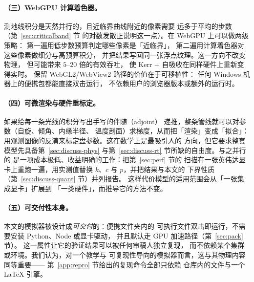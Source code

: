 \paragraph{（三）WebGPU 计算着色器。}
测地线积分是天然并行的，且近临界曲线附近的像素需要
远多于平均的步数（第~\ref{sec:criticalband} 节
的对数发散正说明这一点）。在 WebGPU 上可以做两级策略：
第一遍用低步数预算判定哪些像素是「近临界」，
第二遍用计算着色器对这些像素做细分与高预算积分，
并把结果写回同一张浮点纹理。这一方向不改变物理，
但可能带来 $5$--$20$ 倍的有效吞吐，
使 Kerr + 自吸收在同样硬件上重新变得实时。
保留 WebGL2/WebView2 路径的价值在于可移植性：
任何 Windows 机器上的便携包都能直接双击运行，
不依赖用户的浏览器版本或额外的运行时。

\paragraph{（四）可微渲染与硬件重标定。}
如果给每一条光线的积分写出手写的伴随（adjoint）
递推，整条管线就可以对参数（自旋、倾角、内缘半径、
温度剖面）求梯度，从而把「渲染」变成「拟合」：
用观测图像的反演来标定盘参数。这在数学上是最吸引人的
方向，但它要求整套模型先具备第~\ref{sec:discuss-phys}
与第~\ref{sec:discuss-rt} 节所缺的自由度。与之并行的
是一项成本极低、收益明确的工作：把第~\ref{sec:perf} 节的
扫描在一张英伟达显卡上重跑一遍，用实测值替换
$k$、$c$ 与 $p$，并把结果与本文的
下界性质（第~\ref{sec:discuss-quant} 节）并列报告。
这样代价模型的适用范围会从「一张集成显卡」扩展到
「一类硬件」，而推导它的方法不变。

\paragraph{（五）可交付性本身。}
本文的模拟器被设计成\emph{可交付}的：便携文件夹内的
可执行文件双击即运行，不需要安装 Python、Node 或显卡驱动，
并且默认走 GPU 加速路径（第~\ref{sec:pack} 节）。
这一属性让它的验证结果可以被任何审稿人独立复现，
而不依赖某个集群或环境。我们认为，对一个教学与
可复现性导向的模拟器而言，这与其物理内容同等重要——
第~\ref{app:repro} 节给出的复现命令全部只依赖
仓库内的文件与一个 LaTeX 引擎。

\FloatBarrier
